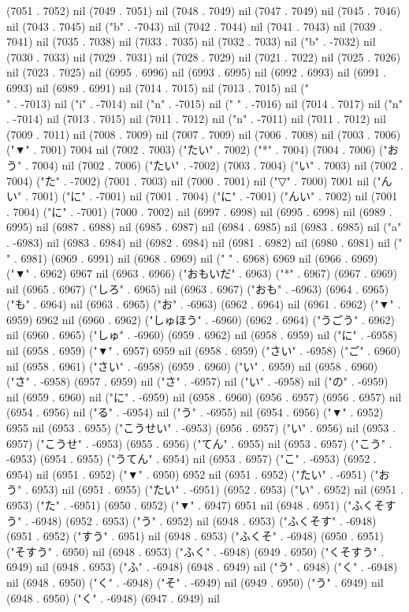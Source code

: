 (7051 . 7052) nil (7049 . 7051) nil (7048 . 7049) nil (7047 . 7049) nil (7045 . 7046) nil (7043 . 7045) nil ("b" . -7043) nil (7042 . 7044) nil (7041 . 7043) nil (7039 . 7041) nil (7035 . 7038) nil (7033 . 7035) nil (7032 . 7033) nil ("b" . -7032) nil (7030 . 7033) nil (7029 . 7031) nil (7028 . 7029) nil (7021 . 7022) nil (7025 . 7026) nil (7023 . 7025) nil (6995 . 6996) nil (6993 . 6995) nil (6992 . 6993) nil (6991 . 6993) nil (6989 . 6991) nil (7014 . 7015) nil (7013 . 7015) nil ("\\" . -7013) nil ("i" . -7014) nil ("n" . -7015) nil (" " . -7016) nil (7014 . 7017) nil ("n" . -7014) nil (7013 . 7015) nil (7011 . 7012) nil ("n" . -7011) nil (7011 . 7012) nil (7009 . 7011) nil (7008 . 7009) nil (7007 . 7009) nil (7006 . 7008) nil (7003 . 7006) ("▼" . 7001) 7004 nil (7002 . 7003) ("たい" . 7002) ("*" . 7004) (7004 . 7006) ("おう" . 7004) nil (7002 . 7006) ("たい" . -7002) (7003 . 7004) ("い" . 7003) nil (7002 . 7004) ("た" . -7002) (7001 . 7003) nil (7000 . 7001) nil ("▽" . 7000) 7001 nil ("んい" . 7001) ("に" . -7001) nil (7001 . 7004) ("に" . -7001) ("んい" . 7002) nil (7001 . 7004) ("に" . -7001) (7000 . 7002) nil (6997 . 6998) nil (6995 . 6998) nil (6989 . 6995) nil (6987 . 6988) nil (6985 . 6987) nil (6984 . 6985) nil (6983 . 6985) nil ("a" . -6983) nil (6983 . 6984) nil (6982 . 6984) nil (6981 . 6982) nil (6980 . 6981) nil (" " . 6981) (6969 . 6991) nil (6968 . 6969) nil (" " . 6968) 6969 nil (6966 . 6969) ("▼" . 6962) 6967 nil (6963 . 6966) ("おもいだ" . 6963) ("*" . 6967) (6967 . 6969) nil (6965 . 6967) ("しろ" . 6965) nil (6963 . 6967) ("おも" . -6963) (6964 . 6965) ("も" . 6964) nil (6963 . 6965) ("お" . -6963) (6962 . 6964) nil (6961 . 6962) ("▼" . 6959) 6962 nil (6960 . 6962) ("しゅほう" . -6960) (6962 . 6964) ("うごう" . 6962) nil (6960 . 6965) ("しゅ" . -6960) (6959 . 6962) nil (6958 . 6959) nil ("に" . -6958) nil (6958 . 6959) ("▼" . 6957) 6959 nil (6958 . 6959) ("さい" . -6958) ("ご" . 6960) nil (6958 . 6961) ("さい" . -6958) (6959 . 6960) ("い" . 6959) nil (6958 . 6960) ("さ" . -6958) (6957 . 6959) nil ("さ" . -6957) nil ("い" . -6958) nil ("の" . -6959) nil (6959 . 6960) nil ("に" . -6959) nil (6958 . 6960) (6956 . 6957) (6956 . 6957) nil (6954 . 6956) nil ("る" . -6954) nil ("う" . -6955) nil (6954 . 6956) ("▼" . 6952) 6955 nil (6953 . 6955) ("こうせい" . -6953) (6956 . 6957) ("い" . 6956) nil (6953 . 6957) ("こうせ" . -6953) (6955 . 6956) ("てん" . 6955) nil (6953 . 6957) ("こう" . -6953) (6954 . 6955) ("うてん" . 6954) nil (6953 . 6957) ("こ" . -6953) (6952 . 6954) nil (6951 . 6952) ("▼" . 6950) 6952 nil (6951 . 6952) ("たい" . -6951) ("おう" . 6953) nil (6951 . 6955) ("たい" . -6951) (6952 . 6953) ("い" . 6952) nil (6951 . 6953) ("た" . -6951) (6950 . 6952) ("▼" . 6947) 6951 nil (6948 . 6951) ("ふくそすう" . -6948) (6952 . 6953) ("う" . 6952) nil (6948 . 6953) ("ふくそす" . -6948) (6951 . 6952) ("すう" . 6951) nil (6948 . 6953) ("ふくそ" . -6948) (6950 . 6951) ("そすう" . 6950) nil (6948 . 6953) ("ふく" . -6948) (6949 . 6950) ("くそすう" . 6949) nil (6948 . 6953) ("ふ" . -6948) (6948 . 6949) nil ("う" . 6948) ("く" . -6948) nil (6948 . 6950) ("く" . -6948) ("そ" . -6949) nil (6949 . 6950) ("う" . 6949) nil (6948 . 6950) ("く" . -6948) (6947 . 6949) nil 